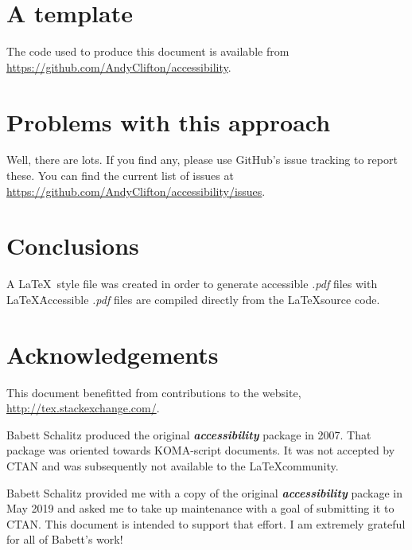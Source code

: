 \documentclass[10pt,twocolumn]{article}
\newcommand{\fn}[1]{\emph{#1}}
\newcommand{\packagename}[1]{\textbf{\emph{#1}}}
\begin{document}
\section{A template}
The code used to produce this document is available from \href{https://github.com/AndyClifton/accessibility}{https://github.com/AndyClifton/accessibility}. 

\section{Problems with this approach}
Well, there are lots. If you find any, please use GitHub's issue tracking to report these. You can find the current list of issues at \url{https://github.com/AndyClifton/accessibility/issues}.

\section{Conclusions}
A \LaTeX\ style file was created in order to generate accessible \fn{.pdf} files with \LaTeX\. Accessible \fn{.pdf} files are compiled directly from the \LaTeX source code.

\section*{Acknowledgements}
This document benefitted from contributions to the website, \url{http://tex.stackexchange.com/}.

Babett Schalitz produced the original \packagename{accessibility} package in 2007. That package was oriented towards KOMA-script documents. It was not accepted by CTAN and was subsequently not available to the \LaTeX community.

Babett Schalitz provided me with a copy of the original \packagename{accessibility} package in May 2019 and asked me to take up maintenance with a goal of submitting it to CTAN. This document is intended to support that effort. I am extremely grateful for all of Babett's work!
\end{document}
